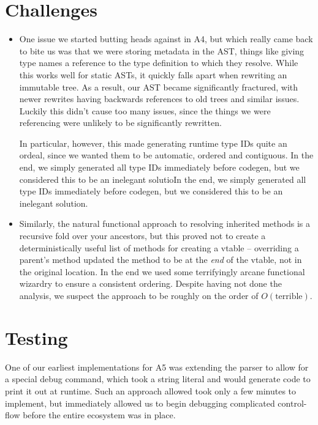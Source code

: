 \documentclass{article}
\begin{document}
\section{Challenges}
\begin{itemize}
    \item One issue we started butting heads against in A4, but which really came back to bite us was that we were
        storing metadata in the AST, things like giving type names a reference to the type definition to which they
        resolve. While this works well for static ASTs, it quickly falls apart when rewriting an immutable tree. As a
        result, our AST became significantly fractured, with newer rewrites having backwards references to old trees and
        similar issues. Luckily this didn't cause too many issues, since the things we were referencing were unlikely to
        be significantly rewritten.

        In particular, however, this made generating runtime type IDs quite an ordeal, since we wanted them to be
        automatic, ordered and contiguous. In the end, we simply generated all type IDs immediately before codegen, but
        we considered this to be an inelegant solutioIn the end, we simply generated all type IDs immediately before
        codegen, but we considered this to be an inelegant solution.
    \item Similarly, the natural functional approach to resolving inherited methods is a recursive fold over your
        ancestors, but this proved not to create a deterministically useful list of methods for creating a vtable --
        overriding a parent's method updated the method to be at the \textit{end} of the vtable, not in the original
        location. In the end we used some terrifyingly arcane functional wizardry to ensure a consistent ordering.
        Despite having not done the analysis, we suspect the approach to be roughly on the order of $O(\text{terrible})$.
\end{itemize}




\section{Testing}
One of our earliest implementations for A5 was extending the parser to allow for a special debug command, which took a
string literal and would generate code to print it out at runtime. Such an approach allowed took only a few minutes to
implement, but immediately allowed us to begin debugging complicated control-flow before the entire ecosystem was in
place.
\end{document}
